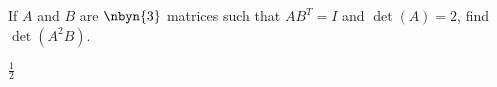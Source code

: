 
\begin{Exercise}[
name={},
title={}, 
difficulty=0,
origin={\cite{BS}}]
If $A$ and $B$ are $\nbyn{3}$ matrices such that $AB^T = I$ and $\det(A) = 2$, find $\det(A^2B)$.
\end{Exercise}

\begin{Answer}
$\frac{1}{2}$
\end{Answer}
